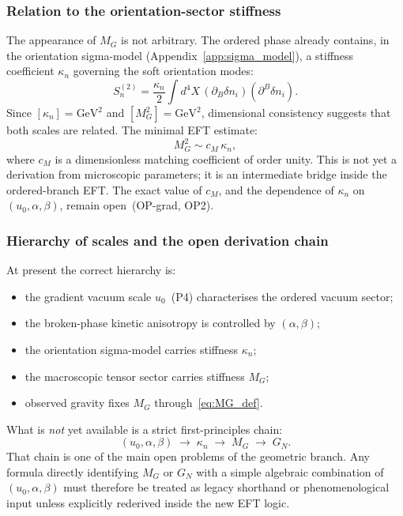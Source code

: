 \documentclass[11pt,a4paper]{article}
\numberwithin{equation}{section}
\begin{document}
\subsubsection*{Relation to the orientation-sector stiffness}

The appearance of $M_G$ is not arbitrary.
The ordered phase already contains, in the orientation sigma-model
(Appendix~\ref{app:sigma_model}), a stiffness coefficient $\kappa_n$
governing the soft orientation modes:
\begin{equation}
  \label{eq:sigma_kappa}
  S_n^{(2)}
  = \frac{\kappa_n}{2}
    \int d^4X\,(\partial_B\delta n_i)(\partial^B\delta n_i).
\end{equation}
Since $[\kappa_n]=\text{GeV}^2$ and $[M_G^2]=\text{GeV}^2$, dimensional
consistency suggests that both scales are related.
The minimal EFT estimate:
\begin{equation}
  \label{eq:MG_condensate}
  M_G^2 \sim c_M\,\kappa_n,
\end{equation}
where $c_M$ is a dimensionless matching coefficient of order unity.
This is not yet a derivation from microscopic parameters; it is an
intermediate bridge inside the ordered-branch EFT.
The exact value of $c_M$, and the dependence of $\kappa_n$ on
$(u_0,\alpha,\beta)$, remain open~(OP-grad, OP2).

\subsubsection*{Hierarchy of scales and the open derivation chain}

At present the correct hierarchy is:
\begin{itemize}
  \item the gradient vacuum scale $u_0$~(P4) characterises the ordered
    vacuum sector;
  \item the broken-phase kinetic anisotropy is controlled by
    $(\alpha,\beta)$;
  \item the orientation sigma-model carries stiffness $\kappa_n$;
  \item the macroscopic tensor sector carries stiffness $M_G$;
  \item observed gravity fixes $M_G$ through~\eqref{eq:MG_def}.
\end{itemize}
What is \emph{not} yet available is a strict first-principles chain:
\begin{equation}
  \label{eq:derivation_chain}
  (u_0,\alpha,\beta)
  \;\longrightarrow\; \kappa_n
  \;\longrightarrow\; M_G
  \;\longrightarrow\; G_N.
\end{equation}
That chain is one of the main open problems of the geometric branch.
Any formula directly identifying $M_G$ or $G_N$ with a simple algebraic
combination of $(u_0,\alpha,\beta)$ must therefore be treated as legacy
shorthand or phenomenological input unless explicitly rederived inside
the new EFT logic.
\end{document}
